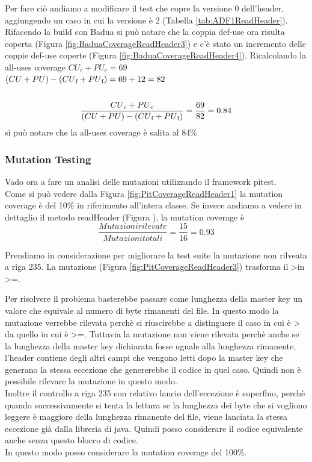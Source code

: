 \documentclass[12pt, a4paper]{article}
\begin{document}
Per fare ciò andiamo a modificare il test che copre la versione 0 dell'header, aggiungendo un caso in cui la versione
è 2 (Tabella \ref{tab:ADF1ReadHeader}).  Rifacendo la build con Badua si può notare che la coppia def-use ora risulta coperta (Figura \ref{fig:BaduaCoverageReadHeader3})
e c'è stato un incremento delle coppie def-use coperte (Figura \ref{fig:BaduaCoverageReadHeader4}). Ricalcolando
la all-uses coverage 
\(CU_c + PU_c = 69\) \\
\( (CU + PU) - (CU\textsubscript{f} + PU\textsubscript{f}) = 69 + 12 = 82\) \\ \\
\[\frac{{CU\textsubscript{c} + PU\textsubscript{c}}}{{(CU + PU) - (CU\textsubscript{f} + PU\textsubscript{f})}} = \frac{{69}}{{82}} = 0.84\]
si può notare che la all-uses coverage è salita al 84\% \\

\subsubsection{Mutation Testing}
Vado ora a fare un analisi delle mutazioni utilizzando il framework pitest. \\
Come si può vedere dalla Figura \ref{fig:PitCoverageReadHeader1} la mutation coverage è del 10\% in riferimento all'intera classe.
Se invece andiamo a vedere in dettaglio il metodo readHeader (Figura ), la mutation coverage è 
\[\frac{{Mutazioni rilevate}}{{Mutazioni totali}} = \frac{{15}}{{16}} = 0.93\]



Prendiamo in considerazione per migliorare la test suite la mutazione non rilveata a riga 235. 
La mutazione (Figura \ref{fig:PitCoverageReadHeader3}) trasforma il \textgreater in \textgreater=.

Per risolvere il problema basterebbe passare come lunghezza della master key un valore che equivale al numero di byte rimanenti
del file. In questo modo la mutazione verrebbe rilevata perchè si riuscirebbe a distinguere il caso in cui è > da quello in cui
è >=. Tuttavia la mutazione non viene rilevata perchè anche se la lunghezza della master key dichiarata fosse uguale alla
lunghezza rimanente, l'header contiene degli altri campi che vengono letti dopo la master key che generano la stessa eccezione 
che genererebbe il codice in quel caso. Quindi non è possibile rilevare la mutazione in questo modo. \\
Inoltre il controllo a riga 235 con relativo lancio dell'eccezione è superfluo, perchè quando successivamente si tenta la lettura
se la lunghezza dei byte che si vogliono leggere è maggiore della lunghezza rimanente del file, viene lanciata la stessa eccezione
già dalla libreria di java. Quindi posso considerare il codice equivalente anche senza questo blocco di codice. \\
In questo modo posso considerare la mutation coverage del 100\%.
\end{document}
